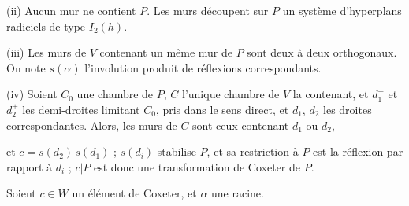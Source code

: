 \documentclass[11pt,a4paper]{article}
\theoremstyle{plain}
\theoremstyle{definition}
\begin{document}
\noindent
\textup{(ii)} Aucun mur ne contient $P$. Les murs d\'ecoupent sur $P$ un syst\`eme d'hyperplans radiciels de type $I_2(h)$.

\smallskip

\noindent
\textup{(iii)} Les murs de $V$ contenant un m\^eme mur de $P$ sont deux \`a deux orthogonaux. On note $s(\alpha)$ l'involution produit de r\'eflexions correspondants.

\smallskip

\noindent
\textup{(iv)} Soient $C_0$ une chambre de $P$, $C$ l'unique chambre de $V$ la contenant, et $d_1^{+}$ et $d_2^{+}$ les demi-droites limitant $C_0$, pris dans le sens direct, et $d_1$, $d_2$ les droites correspondantes. Alors, les murs de $C$ sont ceux contenant $d_1$ ou $d_2$,

\newpage

\noindent
et $c = s(d_2)\, s(d_1)$ ; $s(d_i)$ stabilise $P$, et sa restriction \`a $P$ est la r\'eflexion par rapport \`a $d_i$ ; $c|P$ est donc une transformation de Coxeter de $P$.

\bigskip

Soient $c \in W$ un \'el\'ement de Coxeter, et $\alpha$ une racine.
\end{document}
